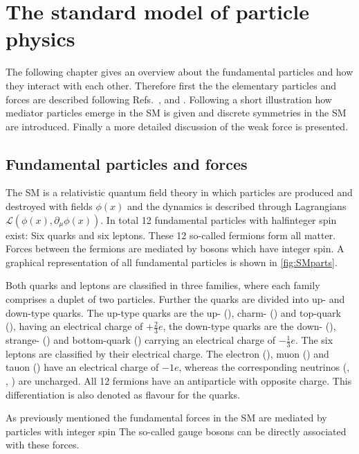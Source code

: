 \chapter{The standard model of particle physics}
\label{chap:SM}

The following chapter gives an overview about the fundamental particles and how they interact with each other.
Therefore first the the elementary particles and forces are described following Refs.~\cite{Griffiths:111880}, \cite{Perkins:396126} and \cite{Peskin:257493}.
Following a short illustration how mediator particles emerge in the \ac{SM} is given and discrete symmetries in the \ac{SM} are introduced.
Finally a more detailed discussion of the weak force is presented.

\section{Fundamental particles and forces}
\label{sec:fundamentalparts}

The \ac{SM} is a relativistic quantum field theory in which particles are produced and destroyed with fields $\phi(x)$ and the dynamics is described through Lagrangians $\mathcal{L}\left(\phi(x),\partial_{\mu}\phi(x)\right)$.
In total \num{12} fundamental particles with halfinteger spin exist: Six quarks and six leptons.
These \num{12} so-called fermions form all matter.
Forces between the fermions are mediated by bosons which have integer spin.
A graphical representation of all fundamental particles is shown in \cref{fig:SMparts}.

Both quarks and leptons are classified in three families, where each family comprises a duplet of two particles.
Further the quarks are divided into up- and down-type quarks. The up-type quarks are the up- (\uquark), charm- (\cquark) and top-quark (\tquark), having an electrical charge of $+\frac{2}{3}e$, the down-type quarks are the down- (\dquark), strange- (\squark) and bottom-quark (\bquark) carrying an electrical charge of $-\frac{1}{3}e$.
The six leptons are classified by their electrical charge.
The electron  (\electron), muon (\muon) and tauon (\tauon) have an electrical charge of $-1e$, whereas the corresponding neutrinos (\neue, \neum, \neut) are uncharged.
All \num{12} fermions have an antiparticle with opposite charge.
This differentiation is also denoted as flavour for the quarks.

As previously mentioned the fundamental forces in the \ac{SM} are mediated by particles with integer spin The so-called gauge bosons can be directly associated with these forces.

